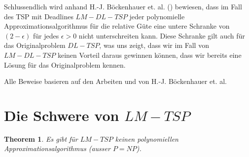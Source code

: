 \documentclass[a4paper,11pt]{scrreprt}
\begin{document}
Schlussendlich wird anhand H.-J. Böckenhauer et. al. (\cite{bok2}) bewiesen, 
dass im Fall des TSP mit Deadlines $LM-DL-TSP$ jeder polynomielle Approximationsalgorithmus für die relative Güte eine untere Schranke von $(2-\epsilon)$ für jedes $\epsilon > 0$ nicht unterschreiten kann. Diese Schranke gilt auch für das Originalproblem $DL-TSP$, was uns zeigt, dass wir im Fall von $LM-DL-TSP$ keinen Vorteil daraus gewinnen können, dass wir bereits eine Lösung für das Originalproblem kennen.

Alle Beweise basieren auf den Arbeiten \cite{bok1} und \cite{bok2} von H.-J. Böckenhauer et. al.

\section{Die Schwere von $LM-TSP$}

\newtheorem{t1}{Theorem}

\begin{t1}
Es gibt für $LM-TSP$ keinen polynomiellen Approximationsalgorithmus (ausser $P = NP$).
\end{t1}
\end{document}
